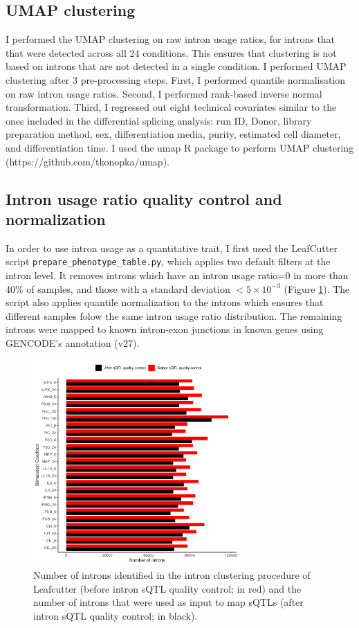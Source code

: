 \subsection{UMAP clustering}
I performed the UMAP clustering on raw intron usage ratios, for introns that that were detected across all 24 conditions. This ensures that clustering is not based on introns that are not detected in a single condition. I performed UMAP clustering after 3 pre-processing steps. First, I performed quantile normalisation on raw intron usage ratios. Second, I performed rank-based inverse normal transformation. Third, I regressed out eight technical covariates similar to the ones included in the differential splicing analysis: run ID, Donor, library preparation method, sex, differentiation media, purity, estimated cell diameter, and differentiation time. I used the umap R package to perform UMAP clustering (https://github.com/tkonopka/umap). 

\subsection{Intron usage ratio quality control and normalization}
In order to use intron usage as a quantitative trait, I first used the LeafCutter script \linebreak \Verb+prepare_phenotype_table.py+, which applies two default filters at the intron level. It removes introns which have an intron usage ratio=0 in more than 40\% of samples, and those with a standard deviation $< 5\times10^{-3}$ (Figure \ref{fig:qc_introns_num}). The script also applies quantile normalization to the introns which ensures that different samples folow the same intron usage ratio distribution. The remaining introns were mapped to known intron-exon junctions in known genes using GENCODE's annotation (v27).

\begin{figure}[H]
  \centering
  \includegraphics[width=0.7\textwidth]{qc_introns_num}
  \caption{Number of introns identified in the intron clustering procedure of
  Leafcutter (before intron sQTL quality control; in red) and the number of introns that were
  used as input to map sQTLs (after intron sQTL quality control; in black).}
  \label{fig:qc_introns_num}   
\end{figure}


